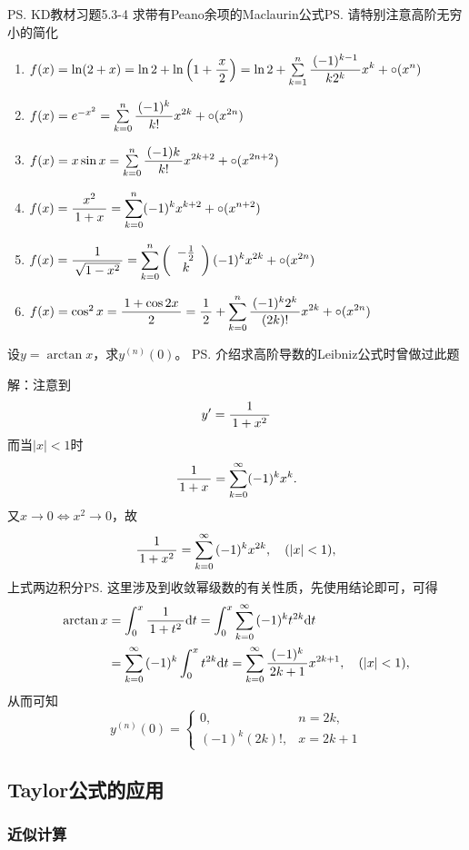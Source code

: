 \egz \ps{KD教材习题5.3-4}
求带有Peano余项的Maclaurin公式\ps{请特别注意高阶无穷小的简化}
\begin{enumerate}[(1)]
  \setlength{\itemindent}{1cm}
  \item $f(x)=\ln(2+x)=\ln2+\ln\left(1+\displaystyle\frac{\,{x}\,}{\,{2}\,}\right)
  =\ln2+\sum\limits_{k=1}^n\displaystyle\frac{\,{(-1)^{k-1}}\,}{\,{k2^k}\,}x^k+\circ(x^n)$ 
  \item $f(x)=e^{-x^2}=\sum\limits_{k=0}^n\displaystyle\frac{\,{(-1)^k}\,}{\,{k!}\,}x^{2k}
  +\circ(x^{2n})$
  \item $f(x)=x\sin x=\sum\limits_{k=0}^{n}\displaystyle\frac{\,{(-1)k}\,}{\,{k!}\,}x^{2k+2}
  +\circ(x^{2n+2})$ 
  \item $f(x)=\displaystyle\frac{\,{x^2}\,}{\,{1+x}\,}=\sum\limits_{k=0}^n(-1)^kx^{k+2}
  +\circ(x^{n+2})$ 
  \item $f(x)=\displaystyle\frac{\,{1}\,}{\,{\sqrt{1-x^2}}\,}=\sum\limits_{k=0}^n\left(
  \begin{array}{c}
  -\frac12\\ k
  \end{array}\right)(-1)^kx^{2k}+\circ(x^{2n})$ 
  \item $f(x)=\cos^2x=\displaystyle\frac{\,{1+\cos2x}\,}{\,{2}\,}=\displaystyle\frac{\,{1}\,}{\,{2}\,}+
  \sum\limits_{k=0}^{n}\displaystyle\frac{\,{(-1)^k2^k}\,}{\,{(2k)!}\,}x^{2k}+\circ(x^{2n})$
\end{enumerate}


\egz 设$y=\arctan x$，求$y^{(n)}(0)$。
\ps{介绍求高阶导数的Leibniz公式时曾做过此题}

解：注意到
$$y'=\displaystyle\frac{\,{1}\,}{\,{1+x^2}\,}$$
而当$|x|<1$时
$$\displaystyle\frac{\,{1}\,}{\,{1+x}\,}=\sum\limits_{k=0}^{\infty}(-1)^kx^k.$$
又$x\to0\Leftrightarrow x^2\to0$，故
$$\displaystyle\frac{\,{1}\,}{\,{1+x^2}\,}=\sum\limits_{k=0}^{\infty}{(-1)^k}x^{2k},\quad (|x|<1),$$
上式两边积分\ps{这里涉及到收敛幂级数的有关性质，先使用结论即可}，可得
\begin{align*}
	\arctan x&=\displaystyle\int_0^x\displaystyle\frac{\,{1}\,}{\,{1+t^2}\,}\mathrm{d} t
	=\displaystyle\int_0^x\sum\limits_{k=0}^{\infty}{(-1)^k}t^{2k}\mathrm{d} t\\
	&=\sum\limits_{k=0}^{\infty}{(-1)^k}\displaystyle\int_0^xt^{2k}\mathrm{d} t
	=\sum\limits_{k=0}^{\infty}\displaystyle\frac{\,{(-1)^k}\,}{\,{2k+1}\,}x^{2k+1},
	\quad (|x|<1),
\end{align*}
从而可知
$$y^{(n)}(0)=\left\{\begin{array}{ll}
0,& n=2k,\\ {(-1)^k}(2k)!,& x=2k+1
\end{array}\right.$$
\fin

\subsection{Taylor公式的应用}

\subsubsection{近似计算}

